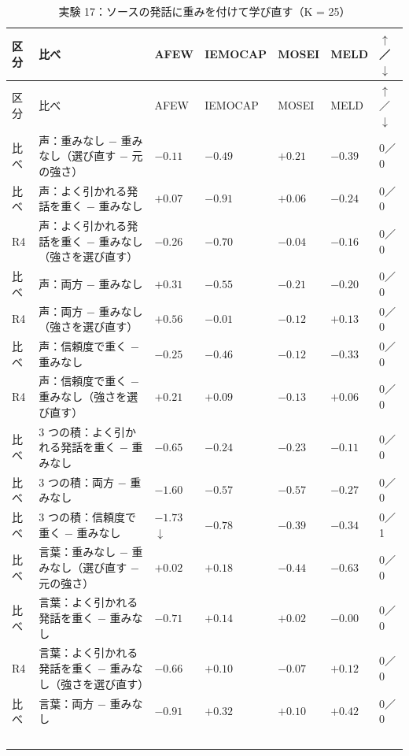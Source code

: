 \begin{longtable}{>{\raggedright}p{0.75cm}>{\raggedright}p{5.6cm}>{\raggedright}p{2.05cm}>{\raggedright}p{2.05cm}>{\raggedright}p{2.05cm}>{\raggedright}p{2.05cm}p{0.75cm}}
\caption{実験 17：ソースの発話に重みを付けて学び直す（K = 25）}\\
\toprule
区分 & 比べ & AFEW & IEMOCAP & MOSEI & MELD & $\uparrow$／$\downarrow$ \\
\midrule
\endfirsthead
\toprule
区分 & 比べ & AFEW & IEMOCAP & MOSEI & MELD & $\uparrow$／$\downarrow$ \\
\midrule
\endhead
\bottomrule
\endfoot

比べ & 声：重みなし $-$ 重みなし（選び直す $-$ 元の強さ） & $-0.11$ & $-0.49$ & $+0.21$ & $-0.39$ & 0／0 \\
比べ & 声：よく引かれる発話を重く $-$ 重みなし & $+0.07$ & $-0.91$ & $+0.06$ & $-0.24$ & 0／0 \\
R4 & 声：よく引かれる発話を重く $-$ 重みなし（強さを選び直す） & $-0.26$ & $-0.70$ & $-0.04$ & $-0.16$ & 0／0 \\
比べ & 声：両方 $-$ 重みなし & $+0.31$ & $-0.55$ & $-0.21$ & $-0.20$ & 0／0 \\
R4 & 声：両方 $-$ 重みなし（強さを選び直す） & $+0.56$ & $-0.01$ & $-0.12$ & $+0.13$ & 0／0 \\
比べ & 声：信頼度で重く $-$ 重みなし & $-0.25$ & $-0.46$ & $-0.12$ & $-0.33$ & 0／0 \\
R4 & 声：信頼度で重く $-$ 重みなし（強さを選び直す） & $+0.21$ & $+0.09$ & $-0.13$ & $+0.06$ & 0／0 \\
比べ & 3 つの積：よく引かれる発話を重く $-$ 重みなし & $-0.65$ & $-0.24$ & $-0.23$ & $-0.11$ & 0／0 \\
比べ & 3 つの積：両方 $-$ 重みなし & $-1.60$ & $-0.57$ & $-0.57$ & $-0.27$ & 0／0 \\
比べ & 3 つの積：信頼度で重く $-$ 重みなし & $-1.73$$\downarrow$ & $-0.78$ & $-0.39$ & $-0.34$ & 0／1 \\
比べ & 言葉：重みなし $-$ 重みなし（選び直す $-$ 元の強さ） & $+0.02$ & $+0.18$ & $-0.44$ & $-0.63$ & 0／0 \\
比べ & 言葉：よく引かれる発話を重く $-$ 重みなし & $-0.71$ & $+0.14$ & $+0.02$ & $-0.00$ & 0／0 \\
R4 & 言葉：よく引かれる発話を重く $-$ 重みなし（強さを選び直す） & $-0.66$ & $+0.10$ & $-0.07$ & $+0.12$ & 0／0 \\
比べ & 言葉：両方 $-$ 重みなし & $-0.91$ & $+0.32$ & $+0.10$ & $+0.42$ & 0／0 \\
$$
\end{longtable}
